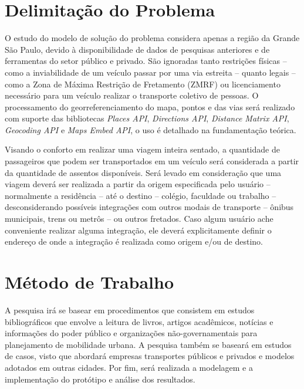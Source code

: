 \section{Delimitação do Problema}
O estudo do modelo de solução do problema considera apenas a região da Grande São Paulo, devido à disponibilidade de dados de pesquisas anteriores e de ferramentas do setor público e privado. São ignoradas tanto restrições físicas -- como a inviabilidade de um veículo passar por uma via estreita -- quanto legais -- como a Zona de Máxima Restrição de Fretamento (ZMRF) ou licenciamento necessário para um veículo realizar o transporte coletivo de pessoas. O processamento do georreferenciamento do mapa, pontos e das vias será realizado com suporte das bibliotecas \emph{Places API}, \emph{Directions API}, \emph{Distance Matrix API}, \emph{Geocoding API} e \emph{Maps Embed API}, o uso é detalhado na fundamentação teórica.

Visando o conforto em realizar uma viagem inteira sentado, a quantidade de passageiros que podem ser transportados em um veículo será considerada a partir da quantidade de assentos disponíveis. Será levado em consideração que uma viagem deverá ser realizada a partir da origem especificada pelo usuário -- normalmente a residência -- até o destino -- colégio, faculdade ou trabalho -- desconsiderando possíveis integrações com outros modais de transporte -- ônibus municipais, trens ou metrôs -- ou outros fretados. Caso algum usuário ache conveniente realizar alguma integração, ele deverá explicitamente definir o endereço de onde a integração é realizada como origem e/ou de destino.

\section{Método de Trabalho}\label{metodo-trabalho}
A pesquisa irá se basear em procedimentos que consistem em estudos bibliográficos que envolve a leitura de livros, artigos acadêmicos, notícias e informações do poder público e organizações não-governamentais para planejamento de mobilidade urbana. A pesquisa também se baseará em estudos de casos, visto que abordará empresas transportes públicos e privados e modelos adotados em outras cidades. Por fim, será realizada a modelagem e a implementação do protótipo e análise dos resultados.

